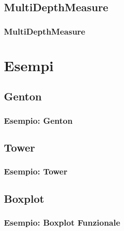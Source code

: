 \documentclass[9pt]{beamer}
\begin{document}

\subsection{MultiDepthMeasure}


\begin{frame}
\frametitle{\ttfamily MultiDepthMeasure}
 
\end{frame}


\section{Esempi}


\subsection{Genton}

\begin{frame}
\frametitle{Esempio: Genton} 

\end{frame}


\subsection{Tower}

\begin{frame}
\frametitle{Esempio: Tower}


 
\end{frame}


\subsection{Boxplot}

\begin{frame}
\frametitle{Esempio: Boxplot Funzionale}

\end{frame}



\end{document}
